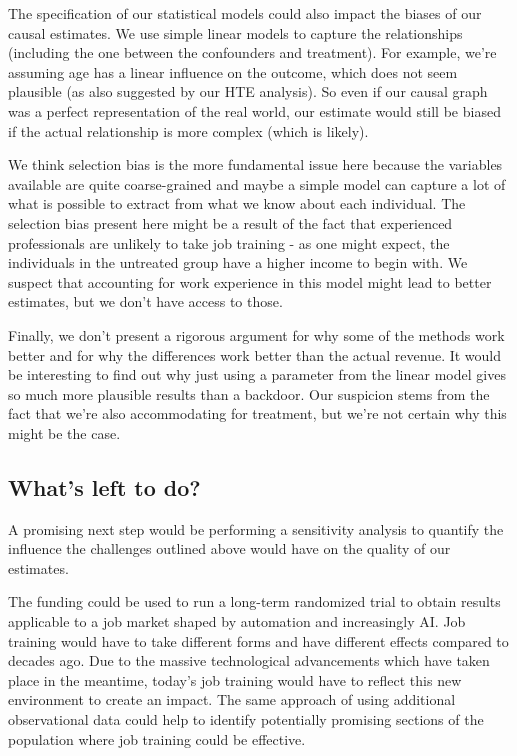 \documentclass[12pt]{article}
\begin{document}
The specification of our statistical models could also impact the biases of our causal estimates. We use simple linear models to capture the relationships (including the one between the confounders and treatment). For example, we're assuming age has a linear influence on the outcome, which does not seem plausible (as also suggested by our HTE analysis). So even if our causal graph was a perfect representation of the real world, our estimate would still be biased if the actual relationship is more complex (which is likely).

We think selection bias is the more fundamental issue here because the variables available are quite coarse-grained and maybe a simple model can capture a lot of what is possible to extract from what we know about each individual. The selection bias present here might be a result of the fact that experienced professionals are unlikely to take job training - as one might expect, the individuals in the untreated group have a higher income to begin with. We suspect that accounting for work experience in this model might lead to better estimates, but we don't have access to those.

Finally, we don't present a rigorous argument for why some of the methods work better and for why the differences work better than the actual revenue. It would be interesting to find out why just using a parameter from the linear model gives so much more plausible results than a backdoor. Our suspicion stems from the fact that we're also accommodating for treatment, but we're not certain why this might be the case.

\subsection*{What's left to do?}

A promising next step would be performing a sensitivity analysis to quantify the influence the challenges outlined above would have on the quality of our estimates. 

The funding could be used to run a long-term randomized trial to obtain results applicable to a job market shaped by automation and increasingly AI. Job training would have to take different forms and have different effects compared to decades ago. Due to the massive technological advancements which have taken place in the meantime, today's job training would have to reflect this new environment to create an impact. The same approach of using additional observational data could help to identify potentially promising sections of the population where job training could be effective.
\end{document}

